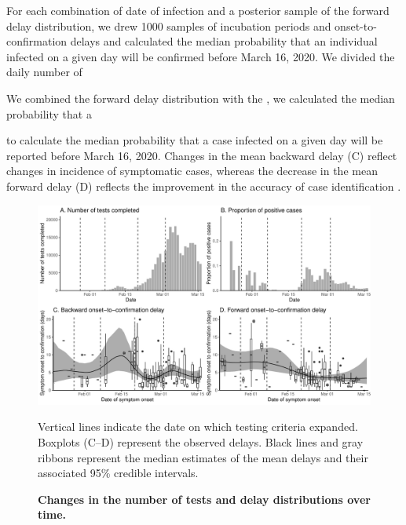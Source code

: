 For each combination of date of infection and a posterior sample of the forward delay distribution, we drew 1000 samples of incubation periods and onset-to-confirmation delays and calculated the median probability that an individual infected on a given day will be confirmed before March 16, 2020.
We divided the daily number of 

We combined the forward delay distribution with the , we calculated the median probability that a 



to calculate the median probability that a case infected on a given day will be reported before March 16, 2020.
Changes in the mean backward delay (C) reflect changes in incidence of symptomatic cases, whereas the decrease in the mean forward delay (D) reflects the improvement in the accuracy of case identification \citep{lai2020effect}.

\pagebreak

\begin{figure}[!ht]
\includegraphics[width=\textwidth]{figure_report_delay.pdf}
\caption{
\textbf{Changes in the number of tests and delay distributions over time.}
}
Vertical lines indicate the date on which testing criteria expanded.
Boxplots (C--D) represent the observed delays.
Black lines and gray ribbons represent the median estimates of the mean delays and their associated 95\% credible intervals.
\end{figure}

\pagebreak

